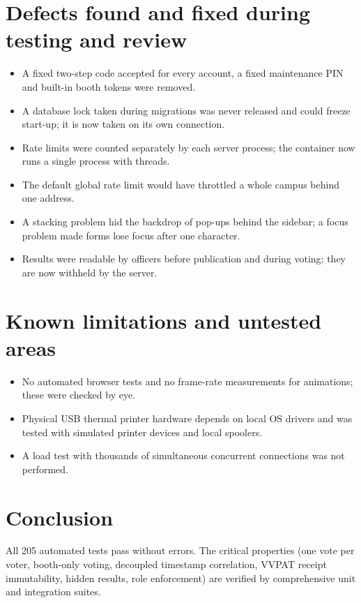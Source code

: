 \section{Defects found and fixed during testing and review}

\begin{itemize}
  \item A fixed two-step code accepted for every account, a fixed maintenance PIN and built-in booth tokens were removed.
  \item A database lock taken during migrations was never released and could freeze start-up; it is now taken on its own connection.
  \item Rate limits were counted separately by each server process; the container now runs a single process with threads.
  \item The default global rate limit would have throttled a whole campus behind one address.
  \item A stacking problem hid the backdrop of pop-ups behind the sidebar; a focus problem made forms lose focus after one character.
  \item Results were readable by officers before publication and during voting; they are now withheld by the server.
\end{itemize}

\section{Known limitations and untested areas}

\begin{itemize}
  \item No automated browser tests and no frame-rate measurements for animations; these were checked by eye.
  \item Physical USB thermal printer hardware depends on local OS drivers and was tested with simulated printer devices and local spoolers.
  \item A load test with thousands of simultaneous concurrent connections was not performed.
\end{itemize}

\section{Conclusion}

All 205 automated tests pass without errors. The critical properties (one vote per voter, booth-only voting, decoupled timestamp correlation, VVPAT receipt immutability, hidden results, role enforcement) are verified by comprehensive unit and integration suites.
